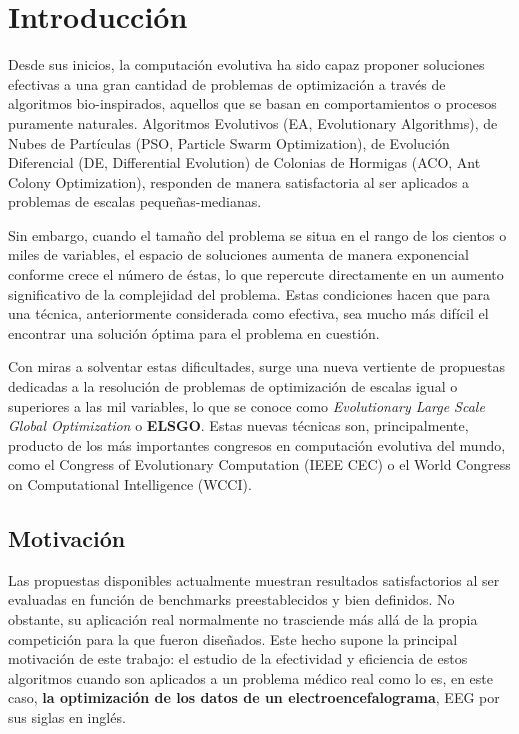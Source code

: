 \chapter{Introducción}

Desde sus inicios, la computación evolutiva ha sido capaz proponer soluciones efectivas a una gran cantidad de problemas de optimización a través de algoritmos bio-inspirados, aquellos que se basan en comportamientos o procesos puramente naturales. Algoritmos Evolutivos (EA, Evolutionary Algorithms), de Nubes de Partículas (PSO, Particle Swarm Optimization), de Evolución Diferencial (DE, Differential Evolution) de Colonias de Hormigas (ACO, Ant Colony Optimization), responden de manera satisfactoria al ser aplicados a problemas de escalas pequeñas-medianas.

Sin embargo, cuando el tamaño del problema se situa en el rango de los cientos o miles de variables, el espacio de soluciones aumenta de manera exponencial conforme crece el número de éstas, lo que repercute directamente en un aumento significativo de la complejidad del problema. Estas condiciones hacen que para una técnica, anteriormente considerada como efectiva, sea mucho más difícil el encontrar una solución óptima para el problema en cuestión.

Con miras a solventar estas dificultades, surge una nueva vertiente de propuestas dedicadas a la resolución de problemas de optimización de escalas igual o superiores a las mil variables, lo que se conoce como\textit{ Evolutionary Large Scale Global Optimization} o \textbf{ELSGO}\cite{ELSGOI}. Estas nuevas técnicas son, principalmente, producto de los más importantes congresos en computación evolutiva del mundo, como el Congress of Evolutionary Computation (IEEE CEC) o el World Congress on Computational Intelligence (WCCI).

\section{Motivación}

Las propuestas disponibles actualmente muestran resultados satisfactorios al ser evaluadas en función de benchmarks preestablecidos y bien definidos. No obstante, su aplicación real normalmente no trasciende más allá de la propia competición para la que fueron diseñados. Este hecho supone la principal motivación de este trabajo: el estudio de la efectividad y eficiencia de estos algoritmos cuando son aplicados a un problema médico real como lo es, en este caso, \textbf{la optimización de los datos de un electroencefalograma}, EEG\cite{EEG} por sus siglas en inglés.

